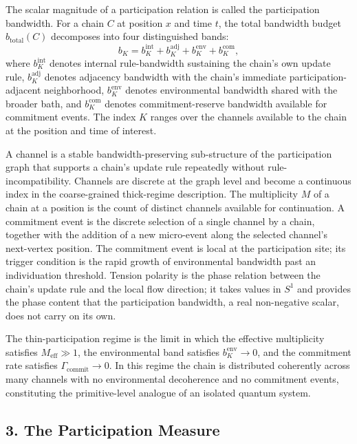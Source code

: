 \documentclass[
  11pt,
]{article}
\begin{document}
The scalar magnitude of a participation relation is called the
participation bandwidth. For a chain \(C\) at position \(x\) and time
\(t\), the total bandwidth budget \(b_{\mathrm{total}}(C)\) decomposes
into four distinguished bands: \begin{equation}
  b_K = b_K^{\mathrm{int}} + b_K^{\mathrm{adj}} + b_K^{\mathrm{env}} + b_K^{\mathrm{com}},
  \label{eq:fourband}
\end{equation} where \(b_K^{\mathrm{int}}\) denotes internal
rule-bandwidth sustaining the chain's own update rule,
\(b_K^{\mathrm{adj}}\) denotes adjacency bandwidth with the chain's
immediate participation-adjacent neighborhood, \(b_K^{\mathrm{env}}\)
denotes environmental bandwidth shared with the broader bath, and
\(b_K^{\mathrm{com}}\) denotes commitment-reserve bandwidth available
for commitment events. The index \(K\) ranges over the channels
available to the chain at the position and time of interest.

A channel is a stable bandwidth-preserving sub-structure of the
participation graph that supports a chain's update rule repeatedly
without rule-incompatibility. Channels are discrete at the graph level
and become a continuous index in the coarse-grained thick-regime
description. The multiplicity \(M\) of a chain at a position is the
count of distinct channels available for continuation. A commitment
event is the discrete selection of a single channel by a chain, together
with the addition of a new micro-event along the selected channel's
next-vertex position. The commitment event is local at the participation
site; its trigger condition is the rapid growth of environmental
bandwidth past an individuation threshold. Tension polarity is the phase
relation between the chain's update rule and the local flow direction;
it takes values in \(S^1\) and provides the phase content that the
participation bandwidth, a real non-negative scalar, does not carry on
its own.

The thin-participation regime is the limit in which the effective
multiplicity satisfies \(M_{\mathrm{eff}} \gg 1\), the environmental
band satisfies \(b_K^{\mathrm{env}} \to 0\), and the commitment rate
satisfies \(\Gamma_{\mathrm{commit}} \to 0\). In this regime the chain
is distributed coherently across many channels with no environmental
decoherence and no commitment events, constituting the primitive-level
analogue of an isolated quantum system.

\subsection{3. The Participation
Measure}\label{the-participation-measure}
\end{document}

